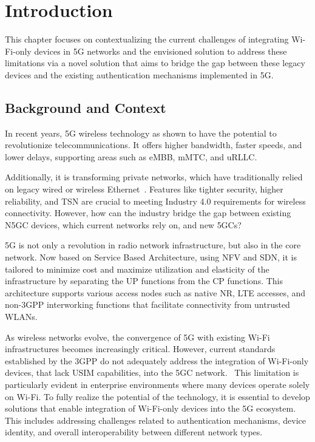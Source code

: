 \chapter{Introduction}%
\label{chapter:introduction}

\begin{introduction}
This chapter focuses on contextualizing the current challenges of integrating Wi-Fi-only devices in \acf{5G} networks and the envisioned solution to address these limitations via a novel solution that aims to bridge the gap between these legacy devices and the existing authentication mechanisms implemented in \ac{5G}.
\end{introduction}

\section{Background and Context}

In recent years, \ac{5G} wireless technology as shown to have the potential to revolutionize telecommunications. It offers higher bandwidth, faster speeds, and lower delays, supporting areas such as \ac{eMBB}, \ac{mMTC}, and \ac{uRLLC}.

Additionally, it is transforming private networks, which have traditionally relied on legacy wired or wireless Ethernet~\cite{altice-01-p3}. Features like tighter security, higher reliability, and \ac{TSN} are crucial to meeting Industry 4.0 requirements for wireless connectivity. However, how can the industry bridge the gap between existing \acf{N5GC} devices, which current networks rely on, and new \acfp{5GC}?

\ac{5G} is not only a revolution in radio network infrastructure, but also in the core network. Now based on Service Based Architecture, using \ac{NFV} and \ac{SDN}, it is tailored to minimize cost and maximize utilization and elasticity of the infrastructure by separating the \ac{UP} functions from the \ac{CP} functions. This architecture supports various access nodes such as native \ac{NR}, \ac{LTE} accesses, and non-\ac{3GPP} interworking functions that facilitate connectivity from untrusted \acp{WLAN}.~\cite{23.501-p41}

As wireless networks evolve, the convergence of \ac{5G} with existing Wi-Fi infrastructures becomes increasingly critical. However, current standards established by the \ac{3GPP} do not adequately address the integration of Wi-Fi-only devices, that lack \ac{USIM} capabilities, into the \ac{5GC} network.~\cite{wba-04-2021-p59} This limitation is particularly evident in enterprise environments where many devices operate solely on Wi-Fi. To fully realize the potential of the technology, it is essential to develop solutions that enable integration of Wi-Fi-only devices into the \ac{5G} ecosystem. This includes addressing challenges related to authentication mechanisms, device identity, and overall interoperability between different network types.


